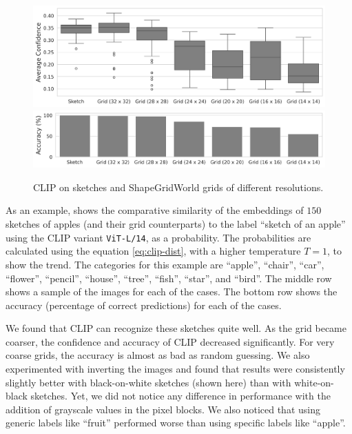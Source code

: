 \begin{figure}[H]
    \centering
    \includegraphics[width=\textwidth]{images/grid_comparison.png}
    \includegraphics[width=\textwidth]{images/grid_comparison_accuracy.png}
    \caption{CLIP on sketches and ShapeGridWorld grids of different resolutions.}
    \label{fig:clip-sketches}
\end{figure}

As an example,  shows the comparative similarity of the embeddings of \(150\) sketches of apples (and their grid counterparts) to the label ``sketch of an apple'' using the CLIP variant \texttt{ViT-L/14}, as a probability.
The probabilities are calculated using the equation \eqref{eq:clip-dist}, with a higher temperature \(T = 1\), to show the trend.
The categories for this example are ``apple'', ``chair'', ``car'', ``flower'', ``pencil'', ``house'', ``tree'', ``fish'', ``star'', and ``bird''.
The middle row shows a sample of the images for each of the cases.
The bottom row shows the accuracy (percentage of correct predictions) for each of the cases.

We found that CLIP can recognize these sketches quite well.
As the grid became coarser, the confidence and accuracy of CLIP decreased significantly.
For very coarse grids, the accuracy is almost as bad as random guessing.
We also experimented with inverting the images and found that results were consistently slightly better with black-on-white sketches (shown here) than with white-on-black sketches.
Yet, we did not notice any difference in performance with the addition of grayscale values in the pixel blocks.
We also noticed that using generic labels like ``fruit'' performed worse than using specific labels like ``apple''.

